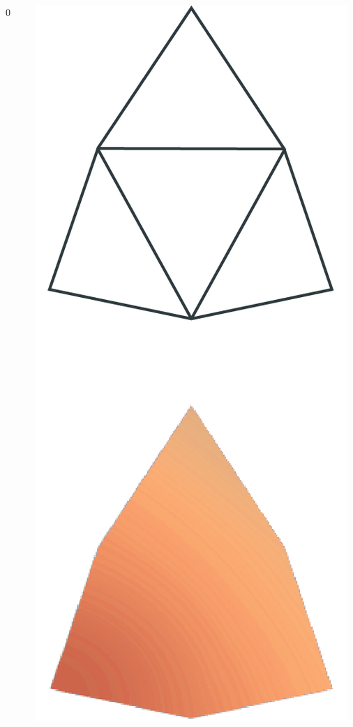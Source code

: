 \begin{frame}
\begin{columns}
\begin{column}[b]{0.22\textwidth}
\begin{center}
				\small{0}
			\end{center}	
		\end{column}
		\begin{column}[b]{0.22\textwidth}
			\begin{center}
				\includegraphics[width=\textwidth]{./img/1_single/lod_lod1.png}	

\end{center}
\end{column}
\end{columns}
\end{frame}
